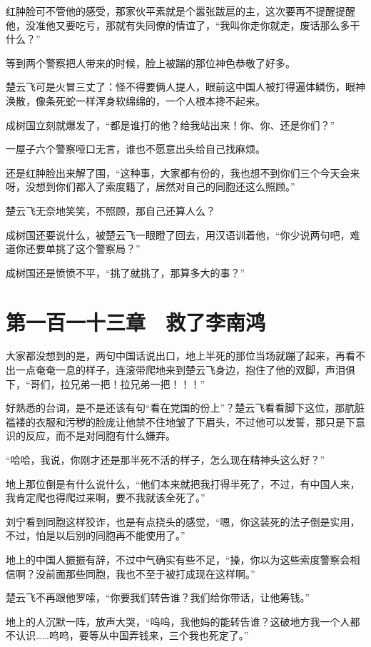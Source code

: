 红肿脸可不管他的感受，那家伙平素就是个嚣张跋扈的主，这次要再不提醒提醒他，没准他又要吃亏，那就有失同僚的情谊了，“我叫你走你就走，废话那么多干什么？”

等到两个警察把人带来的时候，脸上被踹的那位神色恭敬了好多。

楚云飞可是火冒三丈了：怪不得要俩人提人，眼前这中国人被打得遍体鳞伤，眼神涣散，像条死蛇一样浑身软绵绵的，一个人根本搀不起来。

成树国立刻就爆发了，“都是谁打的他？给我站出来！你、你、还是你们？”

一屋子六个警察哑口无言，谁也不愿意出头给自己找麻烦。

还是红肿脸出来解了围，“这种事，大家都有份的，我也想不到你们三个今天会来呀，没想到你们都入了索度籍了，居然对自己的同胞还这么照顾。”

楚云飞无奈地笑笑，不照顾，那自己还算人么？

成树国还要说什么，被楚云飞一眼瞪了回去，用汉语训着他，“你少说两句吧，难道你还要单挑了这个警察局？”

成树国还是愤愤不平，“挑了就挑了，那算多大的事？”

\section{第一百一十三章　救了李南鸿}

大家都没想到的是，两句中国话说出口，地上半死的那位当场就蹦了起来，再看不出一点奄奄一息的样子，连滚带爬地来到楚云飞身边，抱住了他的双脚，声泪俱下，“哥们，拉兄弟一把！拉兄弟一把！！！”

好熟悉的台词，是不是还该有句“看在党国的份上”？楚云飞看看脚下这位，那肮脏褴褛的衣服和污秽的脸庞让他禁不住地皱了下眉头，不过他可以发誓，那只是下意识的反应，而不是对同胞有什么嫌弃。

“哈哈，我说，你刚才还是那半死不活的样子，怎么现在精神头这么好？”

地上那位倒是有什么说什么，“他们本来就把我打得半死了，不过，有中国人来，我肯定爬也得爬过来啊，要不我就该全死了。”

刘宁看到同胞这样狡诈，也是有点挠头的感觉，“嗯，你这装死的法子倒是实用，不过，怕是以后别的同胞再不能使用了。”

地上的中国人振振有辞，不过中气确实有些不足，“操，你以为这些索度警察会相信啊？没前面那些同胞，我也不至于被打成现在这样啊。”

楚云飞不再跟他罗嗦，“你要我们转告谁？我们给你带话，让他筹钱。”

地上的人沉默一阵，放声大哭，“呜呜，我他妈的能转告谁？这破地方我一个人都不认识……呜呜，要等从中国弄钱来，三个我也死定了。”

